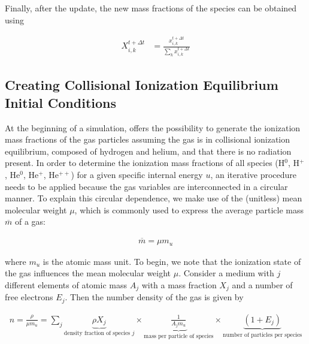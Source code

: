 Finally, after the update, the new mass fractions of the species can be obtained using

\begin{align}
X_{i,k}^{t + \Delta t} &= \frac{x_{i,k}^{t + \Delta t}}{\sum_k x_{i,k}^{t + \Delta t}}
\end{align}










\subsection{Creating Collisional Ionization Equilibrium Initial Conditions}

At the beginning of a simulation, \GEARRT offers the possibility to generate the ionization mass
fractions of the gas particles assuming the gas is in collisional ionization equilibrium, composed
of hydrogen and helium, and that there is no radiation present. In order to determine the
ionization mass fractions of all species (H$^0$, H$^+$, He$^0$, He$^+$, He$^{++}$) for a given
specific internal energy $u$, an iterative procedure needs to be applied because the gas variables
are interconnected in a circular manner. To explain this circular dependence, we make use of the
(unitless) mean molecular weight $\mu$, which is commonly used to express the average particle mass
$\overline{m}$ of a gas:

\begin{align}
    \overline{m} = \mu m_u
\end{align}

where $m_u$ is the atomic mass unit. To begin, we note that the ionization state of the gas
influences the mean molecular weight $\mu$. Consider a medium with $j$ different elements of atomic
mass $A_j$ with a mass fraction $X_j$ and a number of free electrons $E_j$. Then the number density
of the gas is given by

\begin{align}
n = \frac{\rho}{\mu m_u}
    = \sum_j
    \underbrace{\rho X_j}_{\text{density fraction of species } j} \times
    \underbrace{\frac{1}{A_j m_u}}_{\text{mass per particle of species}} \times \underbrace{(1 +
    E_j)}_{\text{number of particles per species}} \label{eq:number-density-MMW}
\end{align}

